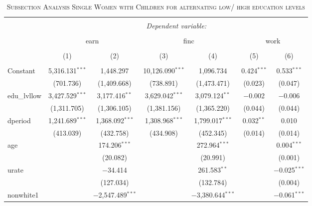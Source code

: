 \documentclass[a4paper]{article}
\begin{document}
\begin{table}[!htbp] \centering 
\begin{adjustwidth}{0.cm}{-0cm}
\begin{threeparttable}
\small
\captionsetup{font=small, justification=raggedright,singlelinecheck=false}
\caption{\textsc{Subsection Analysis Single Women with Children for alternating low/ high education levels}}
\centering 
  \label{}
\small 
\begin{tabular}{@{\extracolsep{-2pt}}lcccccc} 
\\[-5.8ex]\hline 
\hline \\[-1.8ex] 
 & \multicolumn{6}{c}{\textit{Dependent variable:}} \\ 
\cline{2-7} 
\\[-1.8ex] & \multicolumn{2}{c}{earn} & \multicolumn{2}{c}{finc} & \multicolumn{2}{c}{work} \\ 
\\[-1.8ex] & (1) & (2) & (3) & (4) & (5) & (6)\\ 
\hline \\[-1.8ex] 
 Constant & 5,316.131$^{***}$ & 1,448.297 & 10,126.090$^{***}$ & 1,096.734 & 0.424$^{***}$ & 0.533$^{***}$ \\ 
  & (701.736) & (1,409.668) & (738.891) & (1,473.471) & (0.023) & (0.047) \\ 
  edu\_lvllow & 3,427.529$^{***}$ & 3,177.416$^{**}$ & 3,629.042$^{***}$ & 3,079.124$^{**}$ & $-$0.002 & $-$0.006 \\ 
  & (1,311.705) & (1,306.105) & (1,381.156) & (1,365.220) & (0.044) & (0.044) \\ 
  dperiod & 1,241.689$^{***}$ & 1,368.092$^{***}$ & 1,308.968$^{***}$ & 1,799.017$^{***}$ & 0.032$^{**}$ & 0.010 \\ 
  & (413.039) & (432.758) & (434.908) & (452.345) & (0.014) & (0.014) \\ 
  age &  & 174.206$^{***}$ &  & 272.964$^{***}$ &  & 0.004$^{***}$ \\ 
  &  & (20.082) &  & (20.991) &  & (0.001) \\ 
  urate &  & $-$34.414 &  & 261.583$^{**}$ &  & $-$0.025$^{***}$ \\ 
  &  & (127.034) &  & (132.784) &  & (0.004) \\ 
  nonwhite1 &  & $-$2,547.489$^{***}$ &  & $-$3,380.644$^{***}$ &  & $-$0.061$^{***}$ \\ 

\end{tabular}
\end{threeparttable}
\end{adjustwidth}
\end{table}
\end{document}
